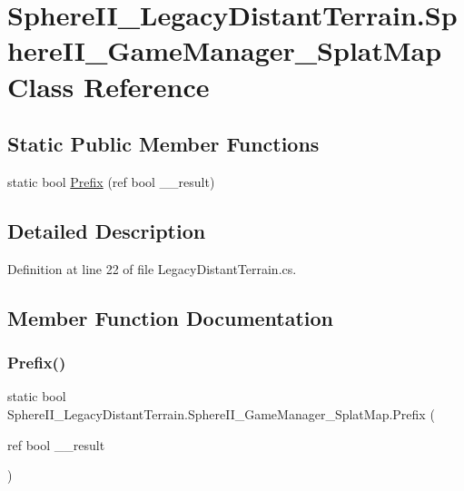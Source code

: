 \hypertarget{class_sphere_i_i___legacy_distant_terrain_1_1_sphere_i_i___game_manager___splat_map}{}\section{Sphere\+I\+I\+\_\+\+Legacy\+Distant\+Terrain.\+Sphere\+I\+I\+\_\+\+Game\+Manager\+\_\+\+Splat\+Map Class Reference}
\label{class_sphere_i_i___legacy_distant_terrain_1_1_sphere_i_i___game_manager___splat_map}
\subsection*{Static Public Member Functions}
\begin{DoxyCompactItemize}
\item 
static bool \mbox{\hyperlink{class_sphere_i_i___legacy_distant_terrain_1_1_sphere_i_i___game_manager___splat_map_a65cd67cdb055a2e04ee9e2a11ab2be59}{Prefix}} (ref bool \+\_\+\+\_\+result)
\end{DoxyCompactItemize}


\subsection{Detailed Description}


Definition at line 22 of file Legacy\+Distant\+Terrain.\+cs.



\subsection{Member Function Documentation}
\mbox{\label{class_sphere_i_i___legacy_distant_terrain_1_1_sphere_i_i___game_manager___splat_map_a65cd67cdb055a2e04ee9e2a11ab2be59}} 
\subsubsection{\texorpdfstring{Prefix()}{Prefix()}}
{\footnotesize\ttfamily static bool Sphere\+I\+I\+\_\+\+Legacy\+Distant\+Terrain.\+Sphere\+I\+I\+\_\+\+Game\+Manager\+\_\+\+Splat\+Map.\+Prefix (\begin{DoxyParamCaption}\item[{ref bool}]{\+\_\+\+\_\+result }\end{DoxyParamCaption})\hspace{0.3cm}{\ttfamily [static]}}



